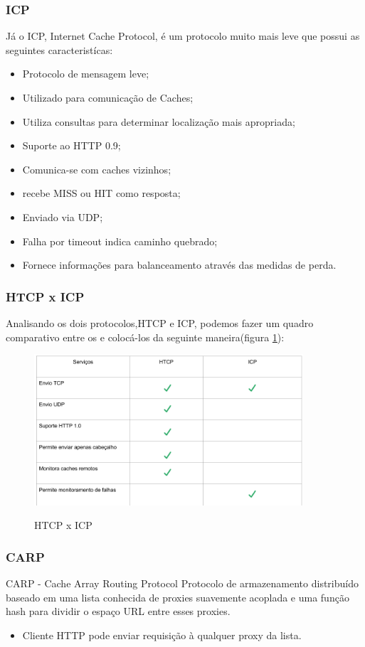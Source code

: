 \subsubsection{ICP}
\label{section:ICP}
J\'a o ICP, Internet Cache Protocol, \'e um protocolo muito mais leve que possui as seguintes caracterist\'icas:
\begin{itemize}
\item Protocolo de mensagem leve;
\item Utilizado para comunica\c{c}\~ao de Caches;
\item Utiliza consultas para determinar localiza\c{c}\~ao mais apropriada;
\item Suporte ao HTTP 0.9;
\item Comunica-se com caches vizinhos;
\item recebe MISS ou HIT como resposta;
\item Enviado via UDP;
\item Falha por timeout indica caminho quebrado;
\item Fornece informa\c{c}\~oes para balanceamento atrav\'es das medidas de perda.
\end{itemize}

\subsubsection{HTCP x ICP}
Analisando os dois protocolos,HTCP e ICP, podemos fazer um quadro comparativo entre os e coloc\'a-los da seguinte maneira(figura \ref{figura:htcp_x_icp}):

\begin{figure}[h]
\caption{HTCP x ICP}
\includegraphics[width=10cm]{Figuras/htcp_x_icp.png} 
\label{figura:htcp_x_icp}
\end{figure}

\subsubsection{CARP}
\label{section:CARP}
CARP -  Cache Array Routing Protocol
Protocolo de armazenamento distribu\'ido baseado em uma lista conhecida de proxies suavemente acoplada e uma fun\c{c}\~ao hash para dividir o espa\c{c}o URL entre esses proxies.
\begin{itemize}
\item Cliente HTTP pode enviar requisi\c{c}\~ao \`a qualquer proxy da lista.
\end{itemize}


